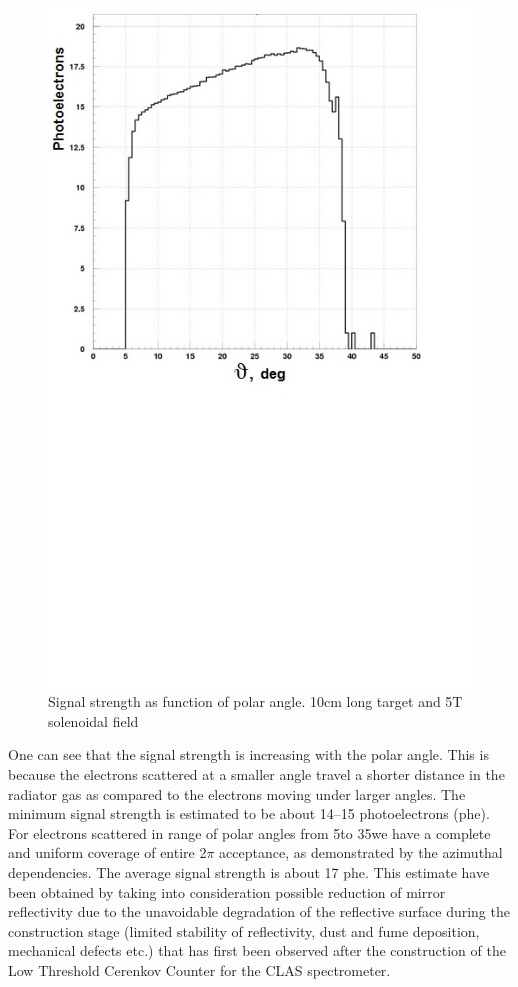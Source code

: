 \begin{figure}[!h]
    \centering
    \includegraphics[width=1.0\linewidth,trim={0.0cm 9.4cm 0.0cm 0.0cm},clip]{images/10cm_Targ_5T_Field_Theta.jpg}
    \caption{Signal strength as function of polar angle. 10cm long target and 5T solenoidal field}
    \label{fig:10cm_Targ_5T_Field_Theta}
\end{figure}

One can see that the signal strength is increasing with the polar angle. This is because the electrons scattered at a smaller angle travel a shorter distance in the radiator gas as compared to the electrons moving under larger angles. The minimum signal strength is estimated to be about 14–15 photoelectrons (phe). For electrons scattered in range of polar angles from 5\degree to 35\degree we have a complete and uniform coverage of entire 2$\pi$ acceptance, as demonstrated by the azimuthal dependencies. The average signal strength is about 17 phe. This estimate have been obtained by taking into consideration possible reduction of mirror reflectivity due to the unavoidable degradation of the reflective surface during the construction stage (limited stability of reflectivity, dust and fume deposition, mechanical defects etc.) that has first been observed after the construction of the Low Threshold Cerenkov Counter for the CLAS spectrometer.


